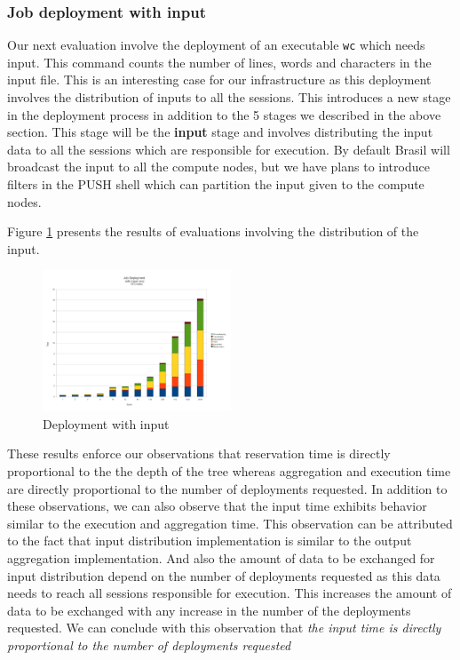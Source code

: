 \documentclass[conference]{sig-alternate}
\begin{document}
\subsubsection{Job deployment with input}
Our next evaluation involve the deployment of an executable \texttt{wc} which
needs input. This command counts the number of lines, words and characters in
the input file.  This is an interesting case for our infrastructure as this
deployment involves the distribution of inputs to all the sessions.  This
introduces a new stage in the deployment process in addition to the 5 stages we
described in the above section.  This stage will be the \textbf{input} stage and
involves distributing the input data to all the sessions which are responsible
for execution.  By default Brasil will broadcast the input to all the compute
nodes, but we have plans to introduce filters in the PUSH shell which can
partition the input given to the compute  nodes. 

Figure \ref{fig:wc_graph} presents the results of evaluations involving the
distribution of the input.


\begin{figure}[h]
  \begin{center}
    \leavevmode
      \includegraphics[height=0.2\textheight,width=0.5\textwidth]
		{./img/wc_graph}
    \caption{Deployment with input}
    \label{fig:wc_graph}
  \end{center}
\end{figure}

These results enforce our observations that reservation time is directly
proportional to the the depth of the tree whereas aggregation and execution time
are directly proportional to the number of deployments requested.  In addition
to these observations, we can also observe that the input time exhibits 
behavior similar to the execution and aggregation time.  This observation can be
attributed to the fact that input distribution implementation is similar
to the output aggregation implementation.  And also the amount of data to be
exchanged for input distribution depend on the number of deployments requested
as this data needs to reach all sessions responsible for execution.  This
increases the amount of data to be exchanged with any increase in the number of
the deployments requested.  We can conclude with this observation that
\textit{the input time is directly proportional to the number of deployments
requested}
\end{document}
